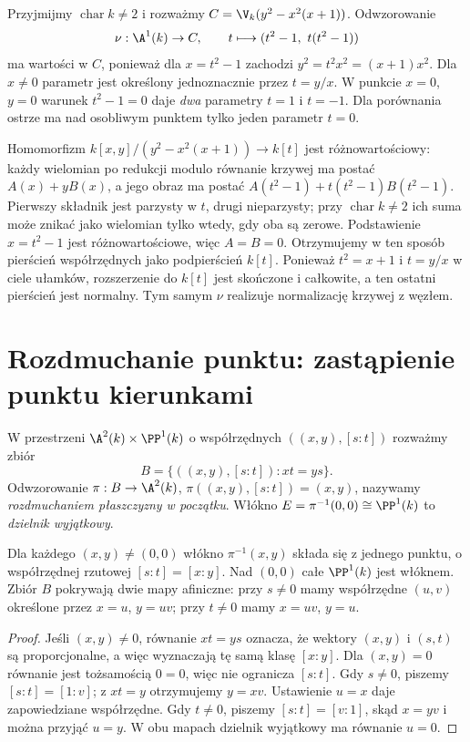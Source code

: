 \begin{przyklad}
\label{pr:node-normalization}
Przyjmijmy $\operatorname{char}k\ne2$ i rozważmy
$C=\V_k(y^2-x^2(x+1))$. Odwzorowanie
\[
 \nu:\A^1(k)\to C,\qquad
 t\longmapsto(t^2-1,\ t(t^2-1))
\]
ma wartości w $C$, ponieważ dla $x=t^2-1$ zachodzi
$y^2=t^2x^2=(x+1)x^2$.
Dla $x\ne0$ parametr jest określony jednoznacznie
przez $t=y/x$. W punkcie $x=0$, $y=0$
warunek $t^2-1=0$ daje \emph{dwa} parametry $t=1$ i $t=-1$.
Dla porównania ostrze ma nad osobliwym punktem tylko
jeden parametr $t=0$.

Homomorfizm $k[x,y]/(y^2-x^2(x+1))\to k[t]$
jest różnowartościowy: każdy wielomian po redukcji modulo
równanie krzywej ma postać $A(x)+yB(x)$, a jego obraz
ma postać $A(t^2-1)+t(t^2-1)B(t^2-1)$.
Pierwszy składnik jest parzysty w $t$, drugi nieparzysty;
przy $\operatorname{char}k\ne2$ ich suma może znikać
jako wielomian tylko wtedy, gdy oba są zerowe.
Podstawienie $x=t^2-1$ jest różnowartościowe, więc
$A=B=0$. Otrzymujemy w ten sposób pierścień współrzędnych
jako podpierścień $k[t]$.
Ponieważ $t^2=x+1$ i $t=y/x$ w ciele ułamków,
rozszerzenie do $k[t]$ jest skończone i całkowite,
a ten ostatni pierścień jest normalny. Tym samym
$\nu$ realizuje normalizację krzywej z węzłem.
\end{przyklad}

\section{Rozdmuchanie punktu: zastąpienie punktu kierunkami}

\begin{definicja}
\label{def:blowup-plane}
W przestrzeni $\A^2(k)\times\PP^1(k)$
o współrzędnych $((x,y),[s:t])$ rozważmy zbiór
\[
 B=\{((x,y),[s:t]):xt=ys\}.
\]
Odwzorowanie $\pi:B\to\A^2(k)$,
$\pi((x,y),[s:t])=(x,y)$, nazywamy
\emph{rozdmuchaniem płaszczyzny w początku}.
Włókno $E=\pi^{-1}(0,0)\cong\PP^1(k)$ to
\emph{dzielnik wyjątkowy}.
\end{definicja}

\begin{stwierdzenie}
Dla każdego $(x,y)\ne(0,0)$ włókno
$\pi^{-1}(x,y)$ składa się z jednego punktu,
o współrzędnej rzutowej $[s:t]=[x:y]$.
Nad $(0,0)$ całe $\PP^1(k)$ jest włóknem.
Zbiór $B$ pokrywają dwie mapy afiniczne:
przy $s\ne0$ mamy współrzędne $(u,v)$ określone przez
$x=u$, $y=uv$; przy $t\ne0$ mamy
$x=uv$, $y=u$.
\end{stwierdzenie}
\begin{proof}
Jeśli $(x,y)\ne0$, równanie $xt=ys$ oznacza,
że wektory $(x,y)$ i $(s,t)$ są proporcjonalne,
a więc wyznaczają tę samą klasę $[x:y]$.
Dla $(x,y)=0$ równanie jest tożsamością $0=0$,
więc nie ogranicza $[s:t]$.
Gdy $s\ne0$, piszemy $[s:t]=[1:v]$;
z $xt=y$ otrzymujemy $y=xv$. Ustawienie $u=x$
daje zapowiedziane współrzędne. Gdy $t\ne0$, piszemy
$[s:t]=[v:1]$, skąd $x=yv$ i można przyjąć $u=y$.
W obu mapach dzielnik wyjątkowy ma równanie $u=0$.
\end{proof}

